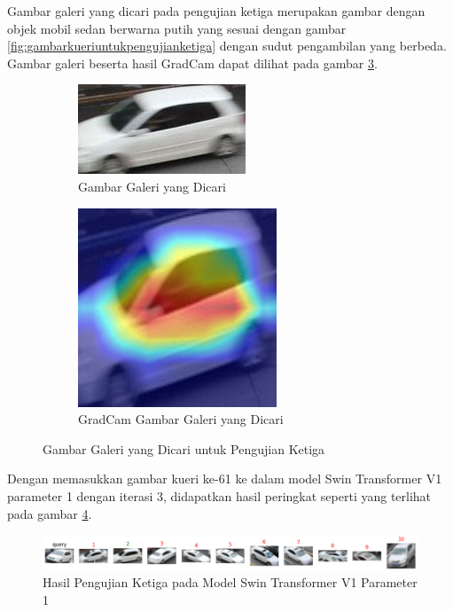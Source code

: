 Gambar galeri yang dicari pada pengujian ketiga merupakan gambar dengan objek \linebreak mobil sedan berwarna putih 
yang sesuai dengan gambar \ref{fig:gambarkueriuntukpengujianketiga} dengan sudut pengambilan yang berbeda. 
Gambar galeri beserta hasil GradCam dapat dilihat pada gambar \ref{fig:gambargaleriuntukpengujianketiga}.

\begin{figure}[h!]
  \centering
  \begin{subfigure}{.5\textwidth}
    \centering
    \includegraphics[width=.4\linewidth]{gambar/Gal61_1120.jpg}
    \caption{Gambar Galeri yang Dicari}
    \label{gambargalerinomorenamsatu}
  \end{subfigure}%
  \begin{subfigure}{.5\textwidth}
    \centering
    \includegraphics[width=.4\linewidth]{gambar/GradCamGal61_1120.jpg}
    \caption{GradCam Gambar Galeri yang Dicari}
    \label{gradcamgambargalerinomorenamsatu}
  \end{subfigure}
  \caption{Gambar Galeri yang Dicari untuk Pengujian Ketiga}
  \label{fig:gambargaleriuntukpengujianketiga}
\end{figure}

Dengan memasukkan gambar kueri ke-61 ke dalam model Swin Transformer V1 parameter 1 dengan iterasi 3, didapatkan hasil 
peringkat seperti yang terlihat pada gambar \ref{fig:hasilpengujianketigapadamodelswintransformerv1param1}.

\begin{figure}[h!]
  \centering
  \includegraphics[scale=0.6]{gambar/Que61V1P1IT3.png}
  \caption{Hasil Pengujian Ketiga pada Model Swin Transformer V1 Parameter 1}
  \label{fig:hasilpengujianketigapadamodelswintransformerv1param1}
\end{figure}

